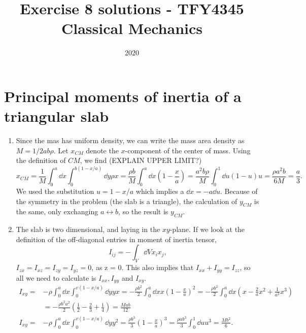 \documentclass{article}
\title{Exercise 8 solutions - TFY4345 Classical Mechanics}
\date{2020}
\begin{document}
    \maketitle
    \section{Principal moments of inertia of a triangular slab}
    \begin{enumerate}[label=(\alph*)]
        \item Since the mas has uniform density, we can write the mass area density as $M =   1/2 ab\rho$. Let $x_{CM}$ denote the $x$-component of the center of mass. Using the definition of $CM$, we find (EXPLAIN UPPER LIMIT?)
        \begin{equation*}
            x_{CM} = \frac{1}{M} \int_0^a \dd x \int_0^{b(1 - x / a)} \dd y \rho x = \frac{\rho b}{M} \int_0^a \dd x \left( 1 - \frac{x}{a}\right) = \frac{a^2 b \rho}{M} \int_0^1 \dd u (1 - u)u = \frac{\rho a^2 b}{6M} = \frac{a}{3}. 
        \end{equation*}
        We used the substitution $u = 1 - x/a$ which implies a $ \dd x = - a \dd u $. Because of the symmetry in the problem (the slab is a triangle), the calculation of $y_{CM}$ is the same, only exchanging $ a \leftrightarrow b $, so the result is $y_{CM}$.
        \item The slab is two dimensional, and laying in the $xy$-plane. If we look at the definition of the off-diagonal entries in moment of inertia tensor,
        \begin{equation*}
            I_{ij} = - \int_V \dd V x_ix_j,
        \end{equation*} $I_{zx} = I_{xz} = I_{zy} = I_{yz} = 0$, as  z = 0. This also implies that $I_{xx} + I_{yy} = I_{zz}$, so all we need to calculate is $I_{xx}, I_{yy}$ and $I_{xy}$.
        \begin{align*}
            I_{xy} =& -\rho \int_0^a \dd x \int_0^{v(1 - x/a)} \dd y yx = - \frac{\rho b^2}{2}\int_0^a \dd x x \left( 1 - \frac{x}{a} \right)^2 = - \frac{\rho b^2}{2} \int_0^a \dd x \left( x - \frac{2}{a}x^2 + \frac{1}{a^2} x^3\right) \\
            &= -\frac{\rho b^2 a^2}{2}\left( \frac{1}{2} - \frac{2}{3} + \frac{1}{4} \right) = \frac{M a b}{12} \\
            I_{xy} = & -\rho \int_0^a \dd x \int_0^{v(1 - x/a)} \dd y y^2 = \frac{\rho b^3}{3}
            \left(1 - \frac{x}{a}\right)^3 = \frac{\rho a b^3}{3} \int_0^1 \dd u u^3 = \frac{M b^2}{6}.

\end{align*}
\end{enumerate}
\end{document}
